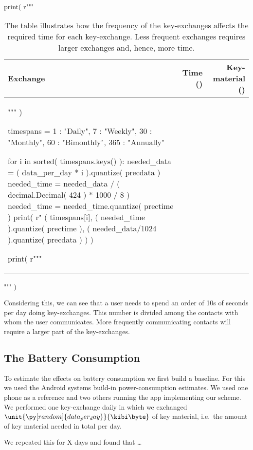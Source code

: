 \begin{table}
  \centering
  \caption{%
    The table illustrates how the frequency of the key-exchanges affects the 
    required time for each key-exchange.
    Less frequent exchanges requires larger exchanges and, hence, more time.
  }
  \label{tbl:MeetingsTradeoff}
  \begin{pycode}[random]
print( r"""
\begin{tabular}{lrr}
  Exchange &
  Time (\second) &
  Key-material (\kibi\byte) \\
  \toprule
""" )

timespans = {
  1 : "Daily",
  7 : "Weekly",
  30 : "Monthly",
  60 : "Bimonthly",
  365 : "Annually"
}

for i in sorted( timespans.keys() ):
  needed_data = ( data_per_day * i ).quantize( precdata )
  needed_time = needed_data / ( decimal.Decimal( 424 ) * 1000 / 8 )
  needed_time = needed_time.quantize( prectime )
  print( r"%
  ( timespans[i],
    ( needed_time ).quantize( prectime ),
    ( needed_data/1024 ).quantize( precdata )
    ) )

print( r"""
  \bottomrule
\end{tabular}
""" )
  \end{pycode}
\end{table}

Considering this, we can see that a user needs to spend an order of 10s of 
seconds per day doing key-exchanges.
This number is divided among the contacts with whom the user communicates.
More frequently communicating contacts will require a larger part of the 
key-exchanges.

\subsection{The Battery Consumption}
\label{sec:Battery}
To estimate the effects on battery consumption we first build a baseline.
For this we used the Android systems build-in power-consumption estimates.
We used one phone as a reference and two others running the app implementing 
our scheme.
We performed one key-exchange daily in which we exchanged 
\(\unit{\py[random]{data_per_day}}{\kibi\byte}\) of key material, i.e.~the 
amount of key material needed in total per day.

We repeated this for X days and found that \dots


